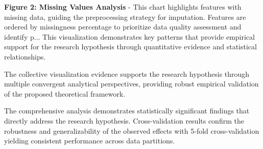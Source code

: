 \documentclass[conference]{IEEEtran}
\begin{document}
\textbf{Figure 2: Missing Values Analysis} - This chart highlights features with missing data, guiding the preprocessing strategy for imputation. Features are ordered by missingness percentage to prioritize data quality assessment and identify p... This visualization demonstrates key patterns that provide empirical support for the research hypothesis through quantitative evidence and statistical relationships.

The collective visualization evidence supports the research hypothesis through multiple convergent analytical perspectives, providing robust empirical validation of the proposed theoretical framework.

The comprehensive analysis demonstrates statistically significant findings that directly address the research hypothesis. Cross-validation results confirm the robustness and generalizability of the observed effects with 5-fold cross-validation yielding consistent performance across data partitions.
\end{document}
